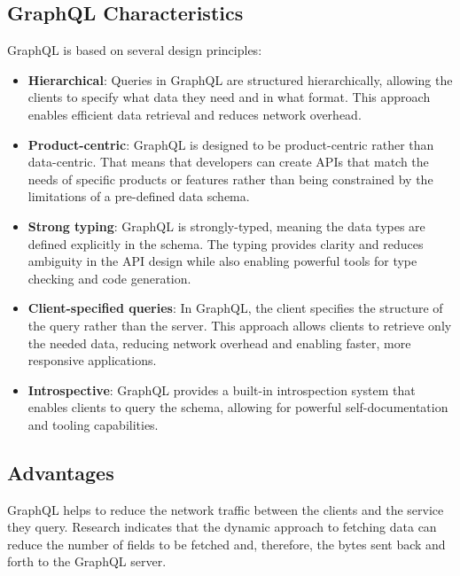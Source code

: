 \subsection{GraphQL Characteristics}\label{subsection:background:graphql:graphql-characteristics}

GraphQL is based on several design principles: \cite{misc:-:background:graphql:graphql-specification}

\begin{itemize}
    \item \textbf{Hierarchical}: Queries in GraphQL are structured hierarchically, allowing the clients to specify what data they need and in what format. This approach enables efficient data retrieval and reduces network overhead.

    \item \textbf{Product-centric}: GraphQL is designed to be product-centric rather than data-centric. That means that developers can create \acp{API} that match the needs of specific products or features rather than being constrained by the limitations of a pre-defined data schema.

    \item \textbf{Strong typing}: GraphQL is strongly-typed, meaning the data types are defined explicitly in the schema. The typing provides clarity and reduces ambiguity in the \ac{API} design while also enabling powerful tools for type checking and code generation.

    \item \textbf{Client-specified queries}: In GraphQL, the client specifies the structure of the query rather than the server. This approach allows clients to retrieve only the needed data, reducing network overhead and enabling faster, more responsive applications.

    \item \textbf{Introspective}: GraphQL provides a built-in introspection system that enables clients to query the schema, allowing for powerful self-documentation and tooling capabilities.
\end{itemize}

\subsection{Advantages}\label{subsection:background:graphql:graphql-advantages}

GraphQL helps to reduce the network traffic between the clients and the service they query. Research indicates that the dynamic approach to fetching data can reduce the number of fields to be fetched and, therefore, the bytes sent back and forth to the GraphQL server. \cite{inprocessdings:2019:background:graphql:migration-to-graphql}

